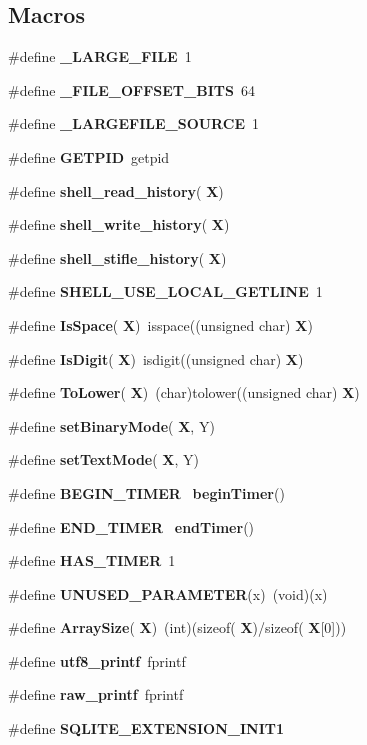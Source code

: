 \subsection*{Macros}
\begin{DoxyCompactItemize}
\item 
\#define \textbf{ \+\_\+\+L\+A\+R\+G\+E\+\_\+\+F\+I\+LE}~1
\item 
\#define \textbf{ \+\_\+\+F\+I\+L\+E\+\_\+\+O\+F\+F\+S\+E\+T\+\_\+\+B\+I\+TS}~64
\item 
\#define \textbf{ \+\_\+\+L\+A\+R\+G\+E\+F\+I\+L\+E\+\_\+\+S\+O\+U\+R\+CE}~1
\item 
\#define \textbf{ G\+E\+T\+P\+ID}~getpid
\item 
\#define \textbf{ shell\+\_\+read\+\_\+history}(\textbf{ X})
\item 
\#define \textbf{ shell\+\_\+write\+\_\+history}(\textbf{ X})
\item 
\#define \textbf{ shell\+\_\+stifle\+\_\+history}(\textbf{ X})
\item 
\#define \textbf{ S\+H\+E\+L\+L\+\_\+\+U\+S\+E\+\_\+\+L\+O\+C\+A\+L\+\_\+\+G\+E\+T\+L\+I\+NE}~1
\item 
\#define \textbf{ Is\+Space}(\textbf{ X})~isspace((unsigned char)\textbf{ X})
\item 
\#define \textbf{ Is\+Digit}(\textbf{ X})~isdigit((unsigned char)\textbf{ X})
\item 
\#define \textbf{ To\+Lower}(\textbf{ X})~(char)tolower((unsigned char)\textbf{ X})
\item 
\#define \textbf{ set\+Binary\+Mode}(\textbf{ X},  Y)
\item 
\#define \textbf{ set\+Text\+Mode}(\textbf{ X},  Y)
\item 
\#define \textbf{ B\+E\+G\+I\+N\+\_\+\+T\+I\+M\+ER}~\textbf{ begin\+Timer}()
\item 
\#define \textbf{ E\+N\+D\+\_\+\+T\+I\+M\+ER}~\textbf{ end\+Timer}()
\item 
\#define \textbf{ H\+A\+S\+\_\+\+T\+I\+M\+ER}~1
\item 
\#define \textbf{ U\+N\+U\+S\+E\+D\+\_\+\+P\+A\+R\+A\+M\+E\+T\+ER}(x)~(void)(x)
\item 
\#define \textbf{ Array\+Size}(\textbf{ X})~(int)(sizeof(\textbf{ X})/sizeof(\textbf{ X}[0]))
\item 
\#define \textbf{ utf8\+\_\+printf}~fprintf
\item 
\#define \textbf{ raw\+\_\+printf}~fprintf
\item 
\#define \textbf{ S\+Q\+L\+I\+T\+E\+\_\+\+E\+X\+T\+E\+N\+S\+I\+O\+N\+\_\+\+I\+N\+I\+T1}

\end{DoxyCompactItemize}
